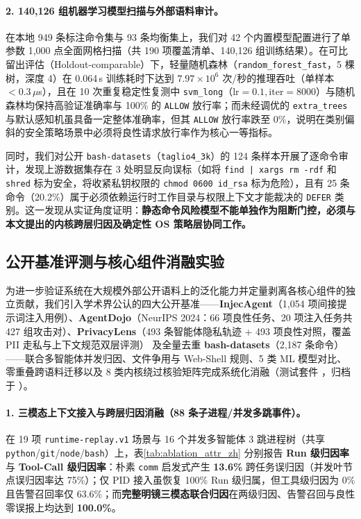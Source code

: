 \documentclass[UTF8,a4paper,zihao=-4,twocolumn]{ctexart}
\newcommand{\code}[1]{\texttt{\small #1}}
\begin{document}
\paragraph{2. 140,126 组机器学习模型扫描与外部语料审计。}
在本地 949 条标注命令集与 93 条均衡集上，我们对 42 个内置模型配置进行了单参数 1,000 点全面网格扫描（共 190 项覆盖清单、140,126 组训练结果）。在可比留出评估（Holdout-comparable）下，轻量随机森林（\code{random\_forest\_fast}，5 棵树，深度 4）在 0.064\,s 训练耗时下达到 $7.97\times 10^6$ 次/秒的推理吞吐（单样本 $<0.3\,\mu$s），且在 10 次重复稳定性复测中 \code{svm\_long}（$\text{lr}=0.1, \text{iter}=8000$）与随机森林均保持高验证准确率与 100\% 的 \code{ALLOW} 放行率；而未经调优的 \code{extra\_trees} 与默认感知机虽具备一定整体准确率，但其 \code{ALLOW} 放行率跌至 $0\%$，说明在类别偏斜的安全策略场景中必须将良性请求放行率作为核心一等指标。

同时，我们对公开 \code{bash-datasets}（\code{taglio4\_3k}）的 124 条样本开展了逐命令审计，发现上游数据集存在 3 处明显反向误标（如将 \code{find | xargs rm -rdf} 和 \code{shred} 标为安全，将收紧私钥权限的 \code{chmod 0600 id\_rsa} 标为危险），且有 25 条命令（20.2\%）属于必须依赖运行时工作目录与权限上下文才能裁决的 \code{DEFER} 类别。这一发现从实证角度证明：\textbf{静态命令风险模型不能单独作为阻断门控，必须与本文提出的内核跨层归因及确定性 OS 策略层协同工作。}

\subsection{公开基准评测与核心组件消融实验}
为进一步验证系统在大规模外部公开语料上的泛化能力并定量剥离各核心组件的独立贡献，我们引入学术界公认的四大公开基准——\textbf{InjecAgent}（1,054 项间接提示词注入用例）\cite{injecagent2024}、\textbf{AgentDojo}（NeurIPS 2024：66 项良性任务、20 项注入任务共 427 组攻击对）\cite{agentdojo2024}、\textbf{PrivacyLens}（493 条智能体隐私轨迹 + 493 项良性对照，覆盖 PII 走私与上下文规范双层评测）\cite{privacylens2024} 及全量去重 \textbf{bash-datasets}（2,187 条命令）——联合多智能体并发归因、文件争用与 Web-Shell 规则、5 类 ML 模型对比、零重叠跨语料迁移以及 8 类内核绕过核验矩阵完成系统化消融（测试套件 ，归档于 ）。

\paragraph{1. 三模态上下文接入与跨层归因消融（88 条子进程/并发多跳事件）。}
在 19 项 \code{runtime-replay.v1} 场景与 16 个并发多智能体 3 跳进程树（共享 \code{python}/\code{git}/\code{node}/\code{bash}）上，表\ref{tab:ablation_attr_zh} 分别报告 \textbf{Run 级归因率} 与 \textbf{Tool-Call 级归因率}：朴素 \code{comm} 启发式产生 \textbf{13.6\%} 跨任务误归因（并发叶节点误归因率达 75\%）；仅 PID 接入虽恢复 100\% Run 级归属，但工具级归因为 0\% 且告警召回率仅 63.6\%；而\textbf{完整明镜三模态联合归因}在两级归因、告警召回与良性零误报上均达到 \textbf{100.0\%}。
\end{document}
